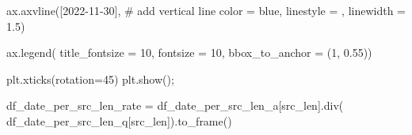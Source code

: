 \documentclass[
  letterpaper,
  DIV=11,
  numbers=noendperiod]{scrartcl}
\newenvironment{Shaded}{\begin{snugshade}}{\end{snugshade}}
\newcommand{\CommentTok}[1]{\textcolor[rgb]{0.37,0.37,0.37}{#1}}
\newcommand{\DecValTok}[1]{\textcolor[rgb]{0.68,0.00,0.00}{#1}}
\newcommand{\FloatTok}[1]{\textcolor[rgb]{0.68,0.00,0.00}{#1}}
\newcommand{\NormalTok}[1]{\textcolor[rgb]{0.00,0.23,0.31}{#1}}
\newcommand{\OperatorTok}[1]{\textcolor[rgb]{0.37,0.37,0.37}{#1}}
\newcommand{\StringTok}[1]{\textcolor[rgb]{0.13,0.47,0.30}{#1}}
\begin{document}
\begin{Shaded}
\begin{Highlighting}[]
\NormalTok{ax.axvline([}\StringTok{\textquotesingle{}2022{-}11{-}30\textquotesingle{}}\NormalTok{], }\CommentTok{\# add vertical line}
\NormalTok{           color }\OperatorTok{=} \StringTok{\textquotesingle{}blue\textquotesingle{}}\NormalTok{,}
\NormalTok{           linestyle }\OperatorTok{=} \StringTok{\textquotesingle{}{-}{-}\textquotesingle{}}\NormalTok{,}
\NormalTok{           linewidth }\OperatorTok{=} \FloatTok{1.5}\NormalTok{)}

\NormalTok{ax.legend( title\_fontsize }\OperatorTok{=} \DecValTok{10}\NormalTok{, fontsize }\OperatorTok{=} \DecValTok{10}\NormalTok{,}
\NormalTok{          bbox\_to\_anchor }\OperatorTok{=}\NormalTok{ (}\DecValTok{1}\NormalTok{, }\FloatTok{0.55}\NormalTok{))}

\NormalTok{plt.xticks(rotation}\OperatorTok{=}\DecValTok{45}\NormalTok{)}
\NormalTok{plt.show()}\OperatorTok{;}
\end{Highlighting}
\end{Shaded}

\begin{Shaded}
\begin{Highlighting}[]
\NormalTok{df\_date\_per\_src\_len\_rate }\OperatorTok{=}\NormalTok{ df\_date\_per\_src\_len\_a[}\StringTok{\textquotesingle{}src\_len\textquotesingle{}}\NormalTok{].div( df\_date\_per\_src\_len\_q[}\StringTok{\textquotesingle{}src\_len\textquotesingle{}}\NormalTok{]).to\_frame()}
\end{Highlighting}
\end{Shaded}
\end{document}
